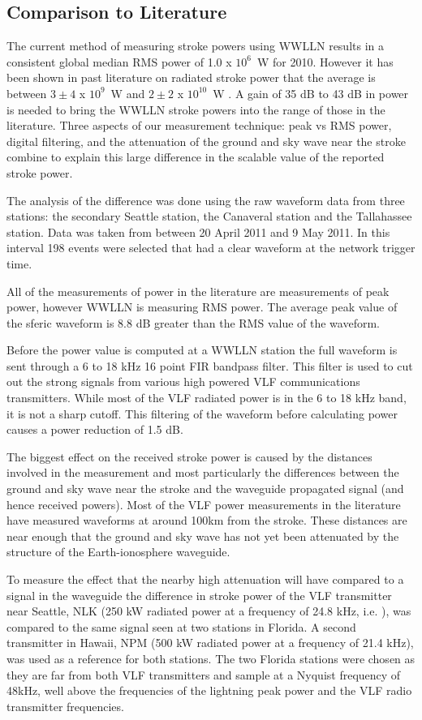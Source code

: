 \documentclass[12pt]{article}
\begin{document}
\subsection{Comparison to Literature}

The current method of measuring stroke powers using WWLLN results in a consistent global median RMS power of 1.0 x $10^6$~W for 2010. However it has been shown in past literature on radiated stroke power that the average is between $3\pm4$ x $10^9$~W and  $2\pm2$ x $10^{10}$~W \citep{Krider1983}. A gain of 35 dB to 43 dB in power is needed to bring the WWLLN stroke powers into the range of those in the literature. Three aspects of our measurement technique: peak vs RMS power, digital filtering, and the attenuation of the ground and sky wave near the stroke combine to explain this large difference in the scalable value of the reported stroke power.

The analysis of the difference was done using the raw waveform data from three stations: the secondary Seattle station, the Canaveral station and the Tallahassee station. Data was taken from between 20 April 2011 and 9 May 2011. In this interval 198 events were selected that had a clear waveform at the network trigger time.

All of the measurements of power in the literature are measurements of peak power, however WWLLN is measuring RMS power. The average peak value of the sferic waveform is 8.8 dB greater than the RMS value of the waveform. 

Before the power value is computed at a WWLLN station the full waveform is sent through a 6 to 18 kHz 16 point FIR bandpass filter. This filter is used to cut out the strong signals from various high powered VLF communications transmitters. While most of the VLF radiated power is in the 6 to 18 kHz band, it is not a sharp cutoff. This filtering of the waveform before calculating power causes a power reduction of 1.5 dB.

The biggest effect on the received stroke power is caused by the distances involved in the measurement and most particularly the differences between the ground and sky wave near the stroke and the waveguide propagated signal (and hence received powers). Most of the VLF power measurements in the literature have measured waveforms at around 100km from the stroke. These distances are near enough that the ground and sky wave has not yet been attenuated by the structure of the Earth-ionosphere waveguide.

To measure the effect that the nearby high attenuation will have compared to a signal in the waveguide the difference in stroke power of the VLF transmitter near Seattle, NLK (250 kW radiated power at a frequency of 24.8 kHz, i.e. \citet{Clilverd2009}), was compared to the same signal seen at two stations in Florida. A second transmitter in Hawaii, NPM (500 kW radiated power at a frequency of 21.4 kHz), was used as a reference for both stations. The two Florida stations were chosen as they are far from both VLF transmitters and sample at a Nyquist frequency of 48kHz, well above the frequencies of the lightning peak power and the VLF radio transmitter frequencies.
\end{document}
